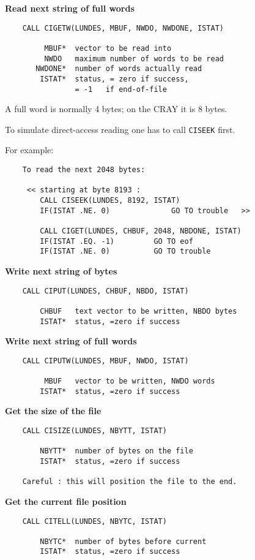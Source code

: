 {\bf Read next string of full words}
\begin{verbatim}
    CALL CIGETW(LUNDES, MBUF, NWDO, NWDONE, ISTAT)
 
         MBUF*  vector to be read into
         NWDO   maximum number of words to be read
       NWDONE*  number of words actually read
        ISTAT*  status, = zero if success,
                = -1   if end-of-file
\end{verbatim}
A full word is normally 4 bytes; on the CRAY it is 8 bytes.
 
   To simulate direct-access reading one has to call {\tt CISEEK} first.
 
   For example:
\begin{verbatim}
    To read the next 2048 bytes:
 
     << starting at byte 8193 :
        CALL CISEEK(LUNDES, 8192, ISTAT)
        IF(ISTAT .NE. 0)              GO TO trouble   >>
 
        CALL CIGET(LUNDES, CHBUF, 2048, NBDONE, ISTAT)
        IF(ISTAT .EQ. -1)         GO TO eof
        IF(ISTAT .NE. 0)          GO TO trouble
\end{verbatim}
 
{\bf Write next string of bytes}
\begin{verbatim}
    CALL CIPUT(LUNDES, CHBUF, NBDO, ISTAT)
 
        CHBUF   text vector to be written, NBDO bytes
        ISTAT*  status, =zero if success
\end{verbatim}
 
{\bf Write next string of full words}
\begin{verbatim}
    CALL CIPUTW(LUNDES, MBUF, NWDO, ISTAT)
 
         MBUF   vector to be written, NWDO words
        ISTAT*  status, =zero if success
\end{verbatim}
 
\newpage
{\bf Get the size of the file}
\begin{verbatim}
    CALL CISIZE(LUNDES, NBYTT, ISTAT)
 
        NBYTT*  number of bytes on the file
        ISTAT*  status, =zero if success
 
    Careful : this will position the file to the end.
\end{verbatim}
 
{\bf Get the current file position}
\begin{verbatim}
    CALL CITELL(LUNDES, NBYTC, ISTAT)
 
        NBYTC*  number of bytes before current
        ISTAT*  status, =zero if success
\end{verbatim}
 
